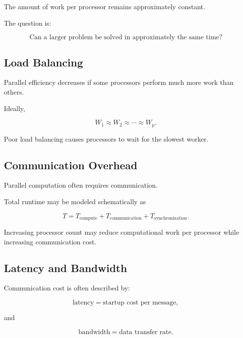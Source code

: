The amount of work per processor remains approximately constant.

The question is:

\[
\boxed{
\text{Can a larger problem be solved in approximately the same time?}
}
\]

\subsection{Load Balancing}
\label{subsec:load-balancing}

Parallel efficiency decreases if some processors perform much more work
than others.

Ideally,

\[
\boxed{
W_1
\approx
W_2
\approx
\cdots
\approx
W_p.
}
\]

Poor load balancing causes processors to wait for the slowest worker.

\subsection{Communication Overhead}
\label{subsec:communication-overhead}

Parallel computation often requires communication.

Total runtime may be modeled schematically as

\[
\boxed{
T
=
T_{\mathrm{compute}}
+
T_{\mathrm{communication}}
+
T_{\mathrm{synchronization}}.
}
\]

Increasing processor count may reduce computational work per processor
while increasing communication cost.

\subsection{Latency and Bandwidth}
\label{subsec:latency-bandwidth}

Communication cost is often described by:

\[
\boxed{
\text{latency}
=
\text{startup cost per message},
}
\]

and

\[
\boxed{
\text{bandwidth}
=
\text{data transfer rate}.
}
\]

